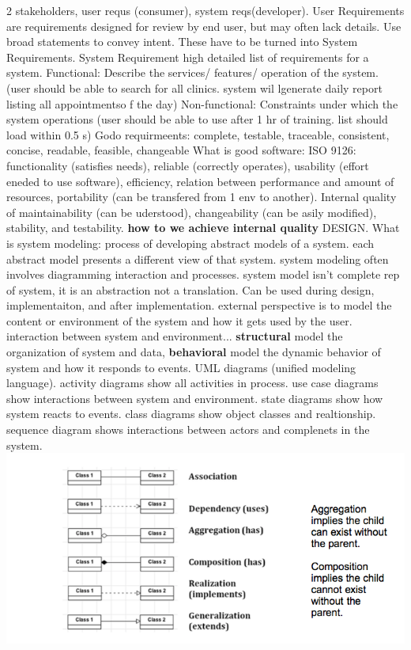 \documentclass[10pt]{article}
\begin{document}
\begin{landscape}
\begin{multicols*}{6}
2 stakeholders, user requs (consumer), system reqs(developer). User Requirements are requirements designed
for review by end user, but may often lack details. Use broad statements to convey intent. These have to be turned into System Requirements. System Requirement high detailed list of requirements for a system.
Functional: Describe the services/ features/ operation of the system. (user should be able to search for all clinics. system wil lgenerate daily report listing all appointmentso f the day)
Non-functional: Constraints under which the system operations (user should be able to use after 1 hr of training. list should load within 0.5 s)
Godo requirmeents: complete, testable, traceable, consistent, concise, readable, feasible, changeable
What is good software: ISO 9126: functionality (satisfies needs), reliable (correctly operates), usability (effort eneded to use software), efficiency, relation between performance and amount of resources, portability (can be transfered from 1 env to another). Internal quality of maintainability (can be uderstood), changeability (can be asily modified), stability, and testability. \textbf{how to we achieve internal quality} DESIGN.
What is system modeling: process of developing abstract models of a system. each abstract model presents a different view of that system. system modeling often involves diagramming interaction and processes. system model isn't complete rep of system, it is an abstraction not a translation. Can be used during design, implementaiton, and after implementation. external perspective is to model the content or environment of the system and how it gets used by the user. interaction between system and environment... \textbf{structural} model the organization of system and data, \textbf{behavioral} model the dynamic behavior of system and how it responds to events. 
UML diagrams (unified modeling language). activity diagrams show all activities in process. use case diagrams show interactions between system and environment. state diagrams show how system reacts to events. class diagrams show object classes and realtionship. sequence diagram shows interactions between actors and complenets in the system. \includegraphics[width=\columnwidth]{uml}

\end{multicols*}
\end{landscape}
\end{document}

